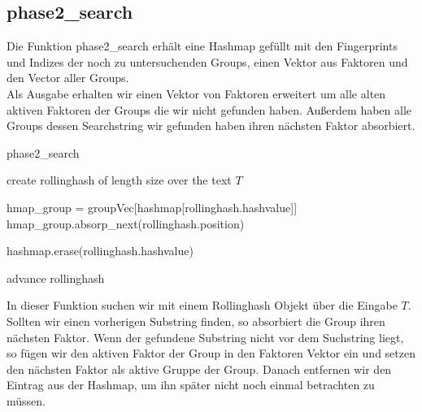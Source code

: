 \subsection{phase2\_search}
Die Funktion phase2\_search erhält eine Hashmap gefüllt mit den Fingerprints und Indizes der noch zu untersuchenden Groups, einen Vektor aus Faktoren und den Vector aller Groups.\\
Als Ausgabe erhalten wir einen Vektor von Faktoren erweitert um alle alten aktiven Faktoren der Groups die wir nicht gefunden haben. Außerdem haben alle Groups dessen Searchstring wir gefunden haben ihren nächsten Faktor absorbiert.\\
\begin{algorithm}[ht!]
	\caption{phase2\_search}
	
	create rollinghash of length size over the text $T$\;
	{
		{
			hmap\_group = groupVec[hashmap[rollinghash.hashvalue]]\;
			{hmap\_group.absorp\_next(rollinghash.position)\;
			}
			
			hashmap.erase(rollinghash.hashvalue)\;
		}
		
		advance rollinghash\;
	}
	
	
\end{algorithm}

\noindent
In dieser Funktion suchen wir mit einem Rollinghash Objekt über die Eingabe $T$. Sollten wir einen vorherigen Substring finden, so  absorbiert die Group ihren nächsten Faktor. Wenn der gefundene Substring nicht vor dem Suchstring liegt, so fügen wir den aktiven Faktor der Group in den Faktoren Vektor ein und setzen den nächsten Faktor als aktive Gruppe der Group. Danach  entfernen wir den Eintrag aus der Hashmap, um ihn später nicht noch einmal  betrachten zu müssen.



